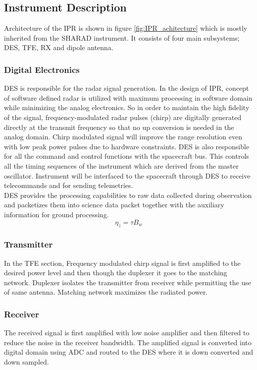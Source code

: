 \subsection{Instrument Description}
Architecture of the \ac{IPR} is shown in figure \ref{fig:IPR_achitecture} which is mostly inherited from the SHARAD instrument. It  consists of four main subsystems; \ac{DES}, \ac{TFE}, \ac{RX} and dipole antenna.
\subsubsection{Digital Electronics}
\ac{DES} is responsible for the radar signal generation. In the design of \ac{IPR}, concept of software defined radar is utilized with maximum processing in software domain while minimizing the analog electronics. So in order to maintain the high fidelity of the signal, frequency-modulated radar pulses (chirp) are digitally generated directly at the transmit frequency so that no up conversion is needed in the analog domain. Chirp modulated signal will improve the range resolution even with low peak power pulses due to hardware constraints.
\ac{DES} is also responsible for all the command and control functions with the spacecraft bus. This controls all the timing sequences of the instrument which are derived from the master oscillator. Instrument will be interfaced to the spacecraft through \ac{DES} to receive telecommands and for sending telemetries.\\
\ac{DES} provides the processing capabilities to raw data collected during observation and packetizes them into science data packet together with the auxiliary information for ground processing.
\begin{equation}
\eta_{z} = \tau B_{w}
\label{eq:chirp gain}
\end{equation}
%
\subsubsection{Transmitter}
In the \ac{TFE} section, Frequency modulated chirp signal is first amplified to the desired power level and then though the duplexer it goes to the matching network. Duplexer isolates the transmitter from receiver while permitting the use of same antenna. Matching network maximizes the radiated power.
%
\subsubsection{Receiver}
The received signal is first amplified with low noise amplifier and then filtered to reduce the noise in the receiver bandwidth. The amplified signal is converted into digital domain using \ac{ADC} and routed to the \ac{DES} where it is down converted and down sampled.
